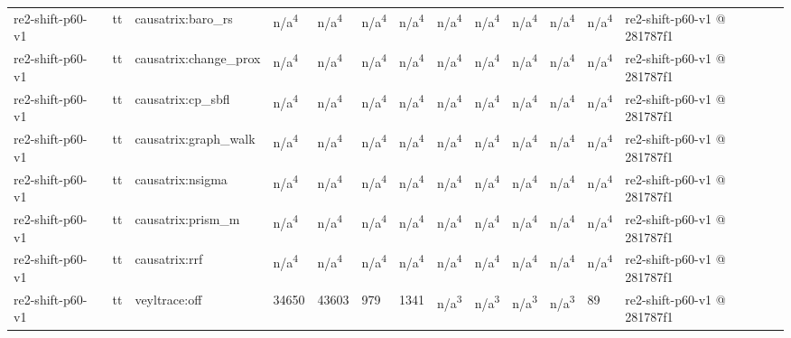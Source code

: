\begin{table}[t]
\begin{tabular}{lllllllllllll}
re2-shift-p60-v1 & tt & causatrix:baro\_rs & n/a\textsuperscript{4} & n/a\textsuperscript{4} & n/a\textsuperscript{4} & n/a\textsuperscript{4} & n/a\textsuperscript{4} & n/a\textsuperscript{4} & n/a\textsuperscript{4} & n/a\textsuperscript{4} & n/a\textsuperscript{4} & re2-shift-p60-v1 @ 281787f1 \\
re2-shift-p60-v1 & tt & causatrix:change\_prox & n/a\textsuperscript{4} & n/a\textsuperscript{4} & n/a\textsuperscript{4} & n/a\textsuperscript{4} & n/a\textsuperscript{4} & n/a\textsuperscript{4} & n/a\textsuperscript{4} & n/a\textsuperscript{4} & n/a\textsuperscript{4} & re2-shift-p60-v1 @ 281787f1 \\
re2-shift-p60-v1 & tt & causatrix:cp\_sbfl & n/a\textsuperscript{4} & n/a\textsuperscript{4} & n/a\textsuperscript{4} & n/a\textsuperscript{4} & n/a\textsuperscript{4} & n/a\textsuperscript{4} & n/a\textsuperscript{4} & n/a\textsuperscript{4} & n/a\textsuperscript{4} & re2-shift-p60-v1 @ 281787f1 \\
re2-shift-p60-v1 & tt & causatrix:graph\_walk & n/a\textsuperscript{4} & n/a\textsuperscript{4} & n/a\textsuperscript{4} & n/a\textsuperscript{4} & n/a\textsuperscript{4} & n/a\textsuperscript{4} & n/a\textsuperscript{4} & n/a\textsuperscript{4} & n/a\textsuperscript{4} & re2-shift-p60-v1 @ 281787f1 \\
re2-shift-p60-v1 & tt & causatrix:nsigma & n/a\textsuperscript{4} & n/a\textsuperscript{4} & n/a\textsuperscript{4} & n/a\textsuperscript{4} & n/a\textsuperscript{4} & n/a\textsuperscript{4} & n/a\textsuperscript{4} & n/a\textsuperscript{4} & n/a\textsuperscript{4} & re2-shift-p60-v1 @ 281787f1 \\
re2-shift-p60-v1 & tt & causatrix:prism\_m & n/a\textsuperscript{4} & n/a\textsuperscript{4} & n/a\textsuperscript{4} & n/a\textsuperscript{4} & n/a\textsuperscript{4} & n/a\textsuperscript{4} & n/a\textsuperscript{4} & n/a\textsuperscript{4} & n/a\textsuperscript{4} & re2-shift-p60-v1 @ 281787f1 \\
re2-shift-p60-v1 & tt & causatrix:rrf & n/a\textsuperscript{4} & n/a\textsuperscript{4} & n/a\textsuperscript{4} & n/a\textsuperscript{4} & n/a\textsuperscript{4} & n/a\textsuperscript{4} & n/a\textsuperscript{4} & n/a\textsuperscript{4} & n/a\textsuperscript{4} & re2-shift-p60-v1 @ 281787f1 \\
re2-shift-p60-v1 & tt & veyltrace:off & 34650 & 43603 & 979 & 1341 & n/a\textsuperscript{3} & n/a\textsuperscript{3} & n/a\textsuperscript{3} & n/a\textsuperscript{3} & 89 & re2-shift-p60-v1 @ 281787f1 \\

\end{tabular}
\end{table}
